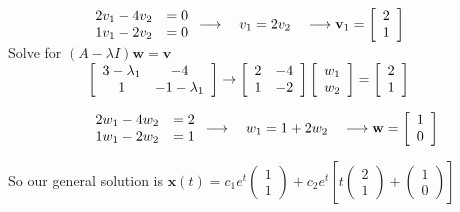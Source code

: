 \documentclass[12pt]{article}
\begin{document}
\begin{enumerate}
    $\hspace*{2cm}\begin{array}{rr} 2v_1 - 4v_2 &=0 \\ 1v_1 - 2v_2 &=0 \end{array} 
     \longrightarrow \quad v_1=2v_2 \quad \longrightarrow \mathbf{v}_1 =\left[\begin{array}{cc} 2 \\ 1 \end{array}\right]$ \\

    \hspace*{2cm}Solve for $ (A - \lambda I)\mathbf{w} = \mathbf{v}$ \\ 
    $\hspace*{2cm}\left[\begin{array}{cc} 3 - \lambda_1 & -4\\ 1 & -1 - \lambda_1\end{array}\right]
    \rightarrow \left[\begin{array}{rr} 2& -4\\ 1 & -2 \end{array}\right] \left[\begin{array}{cc} w_1 \\ w_2 \end{array}\right] = \left[\begin{array}{cc} 2 \\ 1 \end{array}\right]$

    $\hspace*{2cm}\begin{array}{rr} 2w_1 - 4w_2 &=2 \\ 1w_1 - 2w_2 &=1 \end{array} 
    \longrightarrow \quad w_1=1 + 2w_2 \quad \longrightarrow \mathbf{w} =\left[\begin{array}{cc} 1 \\ 0 \end{array}\right]$

    So our general solution is $\mathbf{x}(t) = c_1e^{t} \begin{pmatrix} 1 \\ 1 \end{pmatrix}+ c_2e^{t} \left[ t \begin{pmatrix} 2 \\ 1 \end{pmatrix} + \begin{pmatrix} 1 \\ 0 \end{pmatrix}\right]$


\end{enumerate}
\end{document}
